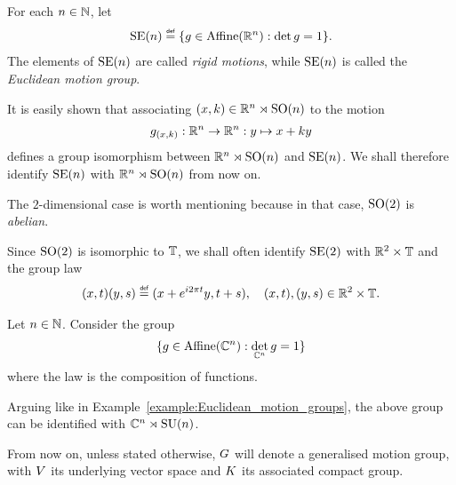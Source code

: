 \begin{example}
\label{example:Euclidean_motion_groups}
    For each $n \in \mathbb{N}$, let
    \begin{align*}
        \MotionGroup{n} \defeq \{g \in \AffineTransformations{\R^n} : \det g = 1\}.
    \end{align*}
    The elements of ${\mathrm{SE} (n)}$ are called \emph{rigid motions},
    while ${\mathrm{SE} (n)}$ is called the \emph{Euclidean motion group}.

    It is easily shown that associating $(x, k) \in \mathbb{R}^n \rtimes {\mathrm{SO} (n)}$ to the motion
    \begin{align*}
        g_{(x, k)} : \mathbb{R}^n \to \mathbb{R}^n : y \mapsto x + ky
    \end{align*}
    defines a group isomorphism between $\mathbb{R}^n \rtimes {\mathrm{SO} (n)}$ and ${\mathrm{SE} (n)}$.
    We shall therefore identify ${\mathrm{SE} (n)}$ with $\mathbb{R}^n \rtimes {\mathrm{SO} (n)}$ from now on.
\end{example}

\begin{example}
\label{example:Euclidean_motion_groups:dimension_2}
    The $2$-dimensional case is worth mentioning because
    in that case, ${\mathrm{SO} (2)}$ is \emph{abelian}.

    Since ${\mathrm{SO} (2)}$ is isomorphic to $\mathbb{T}$,
    we shall often identify ${\mathrm{SE} (2)}$ with $\mathbb{R}^2 \times \mathbb{T}$ and the group law
    \begin{align*}
        (x, t) (y, s) \defeq (x + \e^{\i \turn t} y, t + s), \quad (x, t), (y, s) \in \R^2 \times \T.
    \end{align*}
\end{example}

\begin{example}
    Let $n \in \mathbb{N}$.
    Consider the group
    \begin{align*}
        \{g \in {\mathrm{Affine} (\mathbb{C}^n)} : \det_{\mathbb{C}^n} g = 1\}
    \end{align*}
    where the law is the composition of functions.

    Arguing like in Example~\ref{example:Euclidean_motion_groups},
    the above group can be identified with $\mathbb{C}^n \rtimes {\mathrm{SU} (n)}$.
\end{example}

From now on, unless stated otherwise,
$G$ will denote a generalised motion group,
with $V$ its underlying vector space and $K$ its associated compact group.

